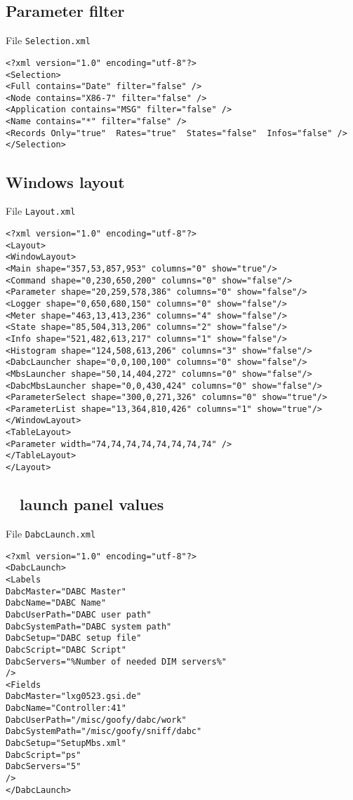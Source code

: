 \subsection{Parameter filter}
File {\tt Selection.xml}
\begin{verbatim}
<?xml version="1.0" encoding="utf-8"?>
<Selection>
<Full contains="Date" filter="false" />
<Node contains="X86-7" filter="false" />
<Application contains="MSG" filter="false" />
<Name contains="*" filter="false" />
<Records Only="true"  Rates="true"  States="false"  Infos="false" />
</Selection>
\end{verbatim}
\subsection{Windows layout}
File {\tt Layout.xml}
\begin{verbatim}
<?xml version="1.0" encoding="utf-8"?>
<Layout>
<WindowLayout>
<Main shape="357,53,857,953" columns="0" show="true"/>
<Command shape="0,230,650,200" columns="0" show="false"/>
<Parameter shape="20,259,578,386" columns="0" show="false"/>
<Logger shape="0,650,680,150" columns="0" show="false"/>
<Meter shape="463,13,413,236" columns="4" show="false"/>
<State shape="85,504,313,206" columns="2" show="false"/>
<Info shape="521,482,613,217" columns="1" show="false"/>
<Histogram shape="124,508,613,206" columns="3" show="false"/>
<DabcLauncher shape="0,0,100,100" columns="0" show="false"/>
<MbsLauncher shape="50,14,404,272" columns="0" show="false"/>
<DabcMbsLauncher shape="0,0,430,424" columns="0" show="false"/>
<ParameterSelect shape="300,0,271,326" columns="0" show="true"/>
<ParameterList shape="13,364,810,426" columns="1" show="true"/>
</WindowLayout>
<TableLayout>
<Parameter width="74,74,74,74,74,74,74,74" />
</TableLayout>
</Layout>
\end{verbatim}
\subsection{\dabc~ launch panel values}
File {\tt DabcLaunch.xml}
\begin{verbatim}
<?xml version="1.0" encoding="utf-8"?>
<DabcLaunch>
<Labels
DabcMaster="DABC Master"
DabcName="DABC Name"
DabcUserPath="DABC user path"
DabcSystemPath="DABC system path"
DabcSetup="DABC setup file"
DabcScript="DABC Script"
DabcServers="%Number of needed DIM servers%"
/>
<Fields
DabcMaster="lxg0523.gsi.de"
DabcName="Controller:41"
DabcUserPath="/misc/goofy/dabc/work"
DabcSystemPath="/misc/goofy/sniff/dabc"
DabcSetup="SetupMbs.xml"
DabcScript="ps"
DabcServers="5"
/>
</DabcLaunch>
\end{verbatim}
